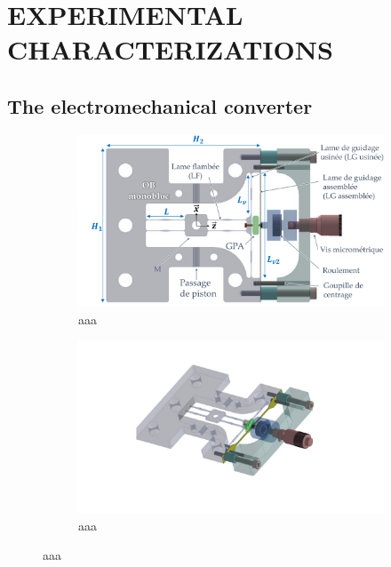 \documentclass[3p,twocolumn,preprint]{elsarticle}
\begin{document}
\section{EXPERIMENTAL CHARACTERIZATIONS}
\label{EXPERIMENTAL CHARACTERIZATIONS}
\lipsum[2]
	\subsection{The electromechanical converter}	
	\label{The electromechanical converter}
\begin{figure}[!htbp]
\begin{center}
\captionsetup{justification=centering}
	\begin{subfigure} [h!]{0.49\textwidth}
		\includegraphics[trim={1.4cm 0cm 0cm 0cm},clip,width=\textwidth]{figures/monobloc+GPA_face.pdf}
		\caption{aaa} 
		\label{fig:/monobloc+GPA_face}
	\end{subfigure}
	\begin{subfigure}[h!]{0.49\textwidth}
		\includegraphics[trim={6cm 3cm 7.5cm 2.6cm},clip, width=\textwidth]{figures/monobloc+GPA_iso.pdf}
		\caption{aaa}  
		\label{fig:/monobloc+GPA_iso}
	\end{subfigure}
	\caption{aaa}
\end{center}
\label{fig:/monobloc+GPA_face}
\end{figure}
\end{document}
